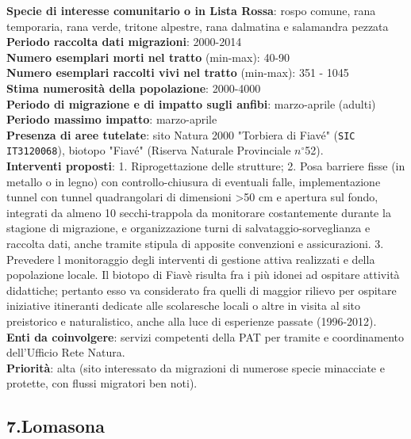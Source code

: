 \documentclass[11pt,a4paper,twoside]{memoir}
\begin{document}
\textbf{Specie di interesse comunitario o in Lista Rossa}: rospo comune, rana temporaria, rana verde, tritone alpestre, rana dalmatina e salamandra pezzata \\
\textbf{Periodo raccolta dati migrazioni}: 2000-2014 \\
\textbf{Numero esemplari morti nel tratto} (min-max): 40-90 \\
\textbf{Numero esemplari raccolti vivi nel tratto} (min-max): 351 - 1045  \\
\textbf{Stima numerosità della popolazione}: 2000-4000 \\
\textbf{Periodo di migrazione e di impatto sugli anfibi}: marzo-aprile (adulti) \\
\textbf{Periodo massimo impatto}: marzo-aprile \\
\textbf{Presenza di aree tutelate}: sito Natura 2000 "Torbiera di Fiavé" (\texttt{SIC IT3120068}), biotopo "Fiavé" (Riserva Naturale Provinciale $n^{\circ}$52). \\
\textbf{Interventi proposti}: 1. Riprogettazione delle strutture; 2. Posa barriere fisse (in metallo o in legno) con controllo-chiusura di eventuali falle, implementazione tunnel con tunnel quadrangolari di dimensioni >50 cm e apertura sul fondo, integrati da almeno 10 secchi-trappola da monitorare costantemente durante la stagione di migrazione, e organizzazione turni di salvataggio-sorveglianza e raccolta dati, anche tramite stipula di apposite convenzioni e assicurazioni. 3. Prevedere l monitoraggio degli interventi di gestione attiva realizzati e della popolazione locale. Il biotopo di Fiavè risulta fra i più idonei ad ospitare attività didattiche; pertanto esso va considerato fra quelli di maggior rilievo per ospitare iniziative itineranti dedicate alle scolaresche locali o altre in visita al sito preistorico e naturalistico, anche alla luce di esperienze passate (1996-2012).  \\
\textbf{Enti da coinvolgere}: servizi competenti della PAT per tramite e coordinamento dell’Ufficio Rete Natura. \\
\textbf{Priorità}: alta (sito interessato da migrazioni di numerose specie minacciate e protette, con flussi migratori ben noti). \\

\newpage
\begin{tcolorbox}[breakable,colback=white,colframe=green,width=10cm]
\subsection{7.Lomasona}
\end{tcolorbox}
\end{document}
